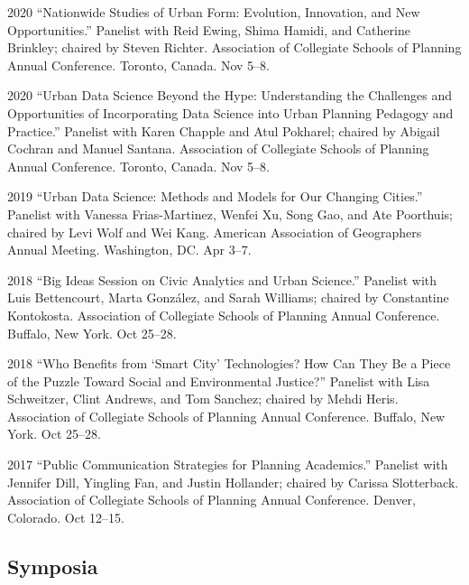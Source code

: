 \documentclass[12pt,letterpaper]{report}
\begin{document}
    \begin{tablist}

        \item[2020] \tab \enquote{Nationwide Studies of Urban Form: Evolution, Innovation, and New Opportunities.} Panelist with Reid Ewing, Shima Hamidi, and Catherine Brinkley; chaired by Steven Richter. Association of Collegiate Schools of Planning Annual Conference. Toronto, Canada. Nov 5--8.

        \item[2020] \tab \enquote{Urban Data Science Beyond the Hype: Understanding the Challenges and Opportunities of Incorporating Data Science into Urban Planning Pedagogy and Practice.} Panelist with Karen Chapple and Atul Pokharel; chaired by Abigail Cochran and Manuel Santana. Association of Collegiate Schools of Planning Annual Conference. Toronto, Canada. Nov 5--8.

        \item[2019] \tab \enquote{Urban Data Science: Methods and Models for Our Changing Cities.} Panelist with Vanessa Frias-Martinez, Wenfei Xu, Song Gao, and Ate Poorthuis; chaired by Levi Wolf and Wei Kang. American Association of Geographers Annual Meeting. Washington, DC. Apr 3--7.

        \item[2018] \tab \enquote{Big Ideas Session on Civic Analytics and Urban Science.} Panelist with Luis Bettencourt, Marta González, and Sarah Williams; chaired by Constantine Kontokosta. Association of Collegiate Schools of Planning Annual Conference. Buffalo, New York. Oct 25--28.

        \item[2018] \tab \enquote{Who Benefits from \enquote{Smart City} Technologies? How Can They Be a Piece of the Puzzle Toward Social and Environmental Justice?} Panelist with Lisa Schweitzer, Clint Andrews, and Tom Sanchez; chaired by Mehdi Heris. Association of Collegiate Schools of Planning Annual Conference. Buffalo, New York. Oct 25--28.

        \item[2017] \tab \enquote{Public Communication Strategies for Planning Academics.} Panelist with Jennifer Dill, Yingling Fan, and Justin Hollander; chaired by Carissa Slotterback. Association of Collegiate Schools of Planning Annual Conference. Denver, Colorado. Oct 12--15.

    \end{tablist}

    \subsection*{Symposia}
\end{document}
